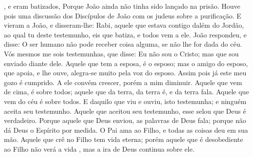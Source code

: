 {{} , e eram batizados,
Porque João ainda não tinha sido lançado na prisão.
Houve pois uma discussão dos Discípulos de João com os judeus sobre a purificação.
E vieram a João, e disseram-lhe: Rabi, aquele que estava contigo dalém do Jordão, ao qual tu deste testemunho, eis que batiza, e todos vem a ele.
João respondeu, e disse: O ser humano não pode receber coisa alguma, se não lhe for dada do céu.
Vós mesmos me sois testemunhas, que disse: Eu não sou o Cristo; mas que sou enviado diante dele.
Aquele que tem a esposa, é o esposo; mas o amigo do esposo, que
{} apoia, e lhe ouve, alegra-se muito pela voz do esposo. Assim pois já este meu gozo é cumprido.
A ele convém crescer, porém a mim diminuir.
Aquele que vem de cima, é sobre todos; aquele que
{} da terra, da terra é, e da terra fala. Aquele que vem do céu é sobre todos.
E daquilo que viu e ouviu, isto testemunha; e ninguém aceita seu testemunho.
Aquele que aceitou seu testemunho, esse selou que Deus é verdadeiro.
Porque aquele que Deus enviou, as palavras de Deus fala; porque não
{} dá Deus o Espírito por medida.
O Pai ama ao Filho, e todas as coisas
{} deu em sua mão.
Aquele que crê no Filho tem vida eterna; porém aquele que é desobediente ao Filho não verá a vida
{} , mas a ira de Deus continua sobre ele.

}
